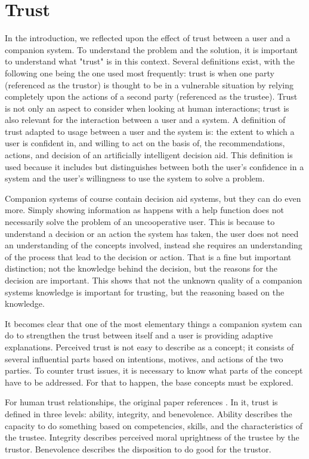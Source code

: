 \documentclass[a4paper]{article}
\begin{document}
\newpage
\section{Trust}

In the introduction, we reflected upon the effect of trust between a user and a companion system. To understand the problem and the solution, it is important to understand what "trust" is in this context. Several definitions exist, with the following one being the one used most frequently: trust is when one party (referenced as the trustor) is thought to be in a vulnerable situation by relying completely upon the actions of a second party (referenced as the trustee). Trust is not only an aspect to consider when looking at human interactions; trust is also relevant for the interaction between a user and a system. A definition of trust adapted to usage between a user and the system is: the extent to which a user is confident in, and willing to act on the basis of, the recommendations, actions, and decision of an artificially intelligent decision aid\cite{htc}. This definition is used because it includes but distinguishes between both the user's confidence in a system and the user's willingness to use the system to solve a problem.

Companion systems of course contain decision aid systems, but they can do even more. Simply showing information as happens with a help function does not necessarily solve the problem of an uncooperative user. This is because to understand a decision or an action the system has taken, the user does not need an understanding of the concepts involved, instead she requires an understanding of the process that lead to the decision or action. That is a fine but important distinction; not the knowledge behind the decision, but the reasons for the decision are important. This shows that not the unknown quality of a companion systems knowledge is important for trusting, but the reasoning based on the knowledge.

It becomes clear that one of the most elementary things a companion system can do to strengthen the trust between itself and a user is providing adaptive explanations. Perceived trust is not easy to describe as a concept; it consists of several influential parts based on intentions, motives, and actions of the two parties. To counter trust issues, it is necessary to know what parts of the concept have to be addressed. For that to happen, the base concepts must be explored.

For human trust relationships, the original paper references \cite{htc}. In it, trust is defined in three levels: ability, integrity, and benevolence. Ability describes the capacity to do something based on competencies, skills, and the characteristics of the trustee. Integrity describes perceived moral uprightness of the trustee by the trustor. Benevolence describes the disposition to do good for the trustor.
\end{document}
